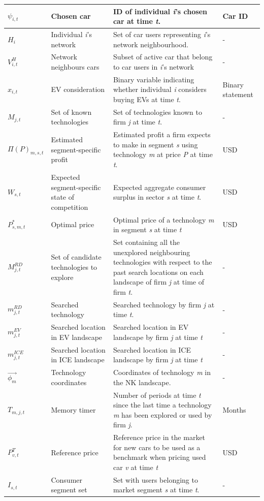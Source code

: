 \documentclass[12pt]{article}
\begin{document}
\begin{longtable}{p{}p{}p{}p{}}
		$\psi_{i,t}$ & Chosen car & ID of individual \textit{i}'s chosen car at time \textit{t}. & Car ID \\
		\hline
		$H_i$ & Individual \textit{i}'s network & Set of car users representing \textit{i}'s network neighbourhood. & - \\
		\hline
		$V^H_{i,t}$ & Network neighbours cars &  Subset of active car that belong to car users in \textit{i}'s network   & - \\
		\hline
		$x_{i,t}$ & EV consideration & Binary variable indicating whether individual \textit{i} considers buying EVs at time \textit{t}. & Binary statement \\
		\hline
		$M_{j,t}$ & Set of known technologies & Set of technologies known to firm \textit{j} at time \textit{t}. & - \\
		\hline
		$\Pi(P)_{m,s,t}$ & Estimated segment-specific profit & Estimated profit a firm expects to make in segment \textit{s} using technology \textit{m} at price \textit{P} at time \textit{t}. & USD \\
		\hline
		$W_{s,t}$ & Expected segment-specific state of competition & Expected aggregate consumer surplus in sector \textit{s} at time \textit{t}. & USD \\
		\hline
		$P^*_{s,m,t}$ & Optimal price & Optimal price of a technology \textit{m} in segment \textit{s} at time \textit{t} & USD \\
		\hline
		$M^{RD}_{j,t}$ & Set of candidate technologies to explore & Set containing all the unexplored neighbouring technologies with respect to the past search locations on each landscape of firm \textit{j} at time of firm \textit{t}. & - \\
		\hline
		$m^{RD}_{j,t}$ & Searched technology & Searched technology by firm \textit{j} at time \textit{t}. & - \\
		\hline
		$m^{EV}_{j,t}$ & Searched location in EV landscape & Searched location in EV landscape by firm \textit{j} at time \textit{t} & - \\
		\hline
		$m^{ICE}_{j,t}$ & Searched location in ICE landscape & Searched location in ICE landscape by firm \textit{j} at time \textit{t} & - \\
		\hline
		$\vec{\phi_{m}}$ & Technology coordinates & Coordinates of technology \textit{m} in the NK landscape. & - \\
		\hline
		$T_{m,j,t}$ & Memory timer & Number of periods at time \textit{t} since the last time a technology \textit{m} has been explored or used by firm \textit{j}. & Months \\
		\hline
		$P^T_{v,t}$ & Reference price & Reference price in the market for new cars to be used as a benchmark when pricing used car \textit{v} at time \textit{t} & USD \\
		\hline
		$I_{s,t}$ & Consumer segment set & Set with users belonging to market segment \textit{s} at time \textit{t}. & - \\
		\hline
	\end{longtable}
\end{document}
